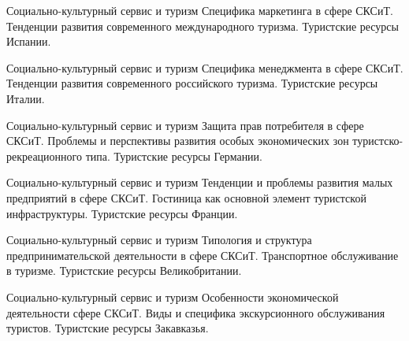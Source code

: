 \documentclass[
	11pt,
	a4paper,
	]
	{article}
\begin{document}
\begin{minipage}[t][\miniH]{\miniL}\centering
	 {Социально-культурный сервис и туризм}
		{
			Специфика маркетинга в сфере СКСиТ.
		}{
			Тенденции развития современного международного туризма.
		}{
			Туристские ресурсы Испании.
		}
	\lowGE
\end{minipage}

\vfill



\begin{minipage}[t][\miniH]{\miniL}\centering
	 {Социально-культурный сервис и туризм}
		{
			Специфика менеджмента в сфере СКСиТ.
		}{
			Тенденции развития современного российского туризма.
		}{
			Туристские ресурсы Италии.
		}
	\lowGE
\end{minipage}

\vfill



\begin{minipage}[t][\miniH]{\miniL}\centering
	 {Социально-культурный сервис и туризм}
		{
			Защита прав потребителя в сфере СКСиТ.
		}{
			Проблемы и перспективы развития особых экономических зон туристско-рекреационного типа.
		}{
			Туристские ресурсы Германии.
		}
	\lowGE
\end{minipage}





\begin{minipage}[t][\miniH]{\miniL}\centering
	 {Социально-культурный сервис и туризм}
		{
			Тенденции и проблемы развития малых предприятий в сфере СКСиТ.
		}{
			Гостиница как основной элемент туристской инфраструктуры.
		}{
			Туристские ресурсы Франции.
		}
	\lowGE
\end{minipage}

\vfill



\begin{minipage}[t][\miniH]{\miniL}\centering
	 {Социально-культурный сервис и туризм}
		{
			Типология и структура предпринимательской деятельности в сфере СКСиТ.
		}{
			Транспортное обслуживание в туризме.
		}{
			Туристские ресурсы Великобритании.
		}
	\lowGE
\end{minipage}

\vfill



\begin{minipage}[t][\miniH]{\miniL}\centering
	 {Социально-культурный сервис и туризм}
		{
			Особенности экономической деятельности сфере СКСиТ.
		}{
			Виды и специфика экскурсионного обслуживания туристов.
		}{
			Туристские ресурсы Закавказья.
		}
	\lowGE
\end{minipage}
\end{document}
